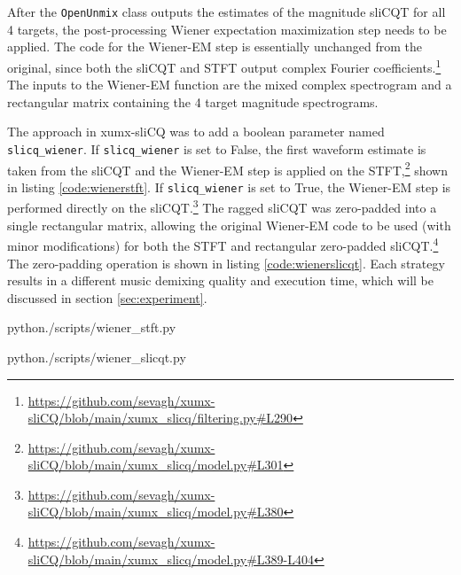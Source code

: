 \documentclass[report.tex]{subfiles}
\begin{document}
After the \Verb#OpenUnmix# class outputs the estimates of the magnitude sliCQT for all 4 targets, the post-processing Wiener expectation maximization step needs to be applied. The code for the Wiener-EM step is essentially unchanged from the original, since both the sliCQT and STFT output complex Fourier coefficients.\footnote{\url{https://github.com/sevagh/xumx-sliCQ/blob/main/xumx_slicq/filtering.py\#L290}} The inputs to the Wiener-EM function are the mixed complex spectrogram and a rectangular matrix containing the 4 target magnitude spectrograms.

The approach in xumx-sliCQ was to add a boolean parameter named \Verb#slicq_wiener#. If \Verb#slicq_wiener# is set to False, the first waveform estimate is taken from the sliCQT and the Wiener-EM step is applied on the STFT,\footnote{\url{https://github.com/sevagh/xumx-sliCQ/blob/main/xumx_slicq/model.py\#L301}} shown in listing \ref{code:wienerstft}. If \Verb#slicq_wiener# is set to True, the Wiener-EM step is performed directly on the sliCQT.\footnote{\url{https://github.com/sevagh/xumx-sliCQ/blob/main/xumx_slicq/model.py\#L380}} The ragged sliCQT was zero-padded into a single rectangular matrix, allowing the original Wiener-EM code to be used (with minor modifications) for both the STFT and rectangular zero-padded sliCQT.\footnote{\url{https://github.com/sevagh/xumx-sliCQ/blob/main/xumx_slicq/model.py\#L389-L404}} The zero-padding operation is shown in listing \ref{code:wienerslicqt}. Each strategy results in a different music demixing quality and execution time, which will be discussed in section \ref{sec:experiment}. 

\begin{listing}[ht]
  \centering
\begin{inputminted}[linenos,breaklines,frame=single,fontsize=\scriptsize]{python}{./scripts/wiener_stft.py}
\end{inputminted}
  \caption{Using the STFT in the Wiener-EM post-processing step}
  \label{code:wienerstft}
\end{listing}

\begin{listing}[ht]
  \centering
\begin{inputminted}[linenos,breaklines,frame=single,fontsize=\scriptsize]{python}{./scripts/wiener_slicqt.py}
\end{inputminted}
  \caption{Zero-padding the sliCQT for the Wiener-EM post-processing step}
  \label{code:wienerslicqt}
\end{listing}
\end{document}
